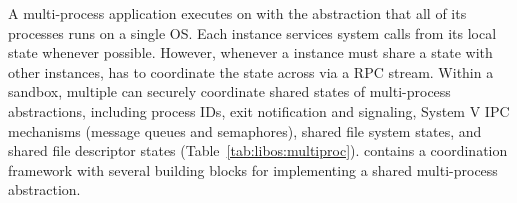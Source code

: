 \label{sec:libos:namespaces}



A multi-process application executes on \graphene{} 
with the abstraction that all of its processes runs on a single OS.
Each \thelibos{} instance services system calls
from its local state whenever possible.
However, whenever a \thelibos{} instance must share a \libos{} state with other instances,
\thelibos{} has to coordinate the state across \picoprocs{}
via a RPC stream.
Within a sandbox, multiple \picoprocs{} 
can securely coordinate shared states of multi-process abstractions, including process IDs, exit notification and signaling, 
System V IPC mechanisms (message queues and semaphores), shared file system states, and shared file descriptor states (Table~\ref{tab:libos:multiproc}).
\thelibos{} contains a coordination framework
with several building blocks for implementing a shared multi-process abstraction.


